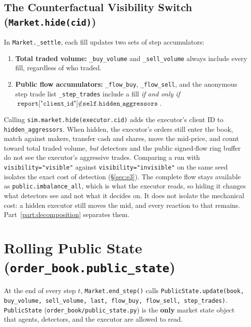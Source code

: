 \documentclass[11pt,a4paper]{article}
\newcommand{\code}[1]{\texttt{#1}}
\begin{document}
\subsection{The Counterfactual Visibility Switch (\code{Market.hide(cid)})}

In \code{Market.\_settle}, each fill updates two sets of step accumulators:
\begin{enumerate}[nosep]
\item \textbf{Total traded volume:} \code{\_buy\_volume} and \code{\_sell\_volume} always include every
  fill, regardless of who traded.
\item \textbf{Public flow accumulators:} \code{\_flow\_buy}, \code{\_flow\_sell}, and the anonymous step
  trade list \code{\_step\_trades} include a fill \emph{if and only if}
  $\code{report["client\_id"]} \notin \code{self.hidden\_aggressors}$.
\end{enumerate}
Calling \code{sim.market.hide(executor.cid)} adds the executor's client ID to
\code{hidden\_aggressors}. When hidden, the executor's orders still enter the book, match against
makers, transfer cash and shares, move the mid-price, and count toward total traded volume, \emph{but}
detectors and the public signed-flow ring buffer do not see the executor's aggressive trades. Comparing
a run with \code{visibility="visible"} against \code{visibility="invisible"} on the same seed isolates
the exact cost of detection (\S\ref{sec:e3}). The complete flow stays available as \code{public.imbalance\_all}, which is what the executor reads, so hiding it changes what detectors see and not what it decides on. It does not isolate the mechanical cost: a hidden executor still moves the mid, and every reaction to that remains. Part~\ref{part:decomposition} separates them.

\section{Rolling Public State (\code{order\_book.public\_state})}
\label{sec:public}

At the end of every step $t$, \code{Market.end\_step()} calls
\code{PublicState.update(book, buy\_volume, sell\_volume, last, flow\_buy, flow\_sell, step\_trades)}.
\code{PublicState} (\code{order\_book/public\_state.py}) is the \textbf{only} market state object that
agents, detectors, and the executor are allowed to read.
\end{document}
